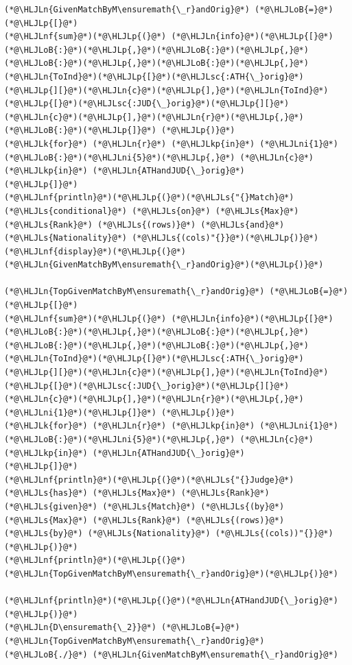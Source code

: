 \documentclass[12pt,a4paper]{article}
\newcommand{\HLJLk}[1]{\textcolor[RGB]{148,91,176}{\textbf{#1}}}
\newcommand{\HLJLkp}[1]{\textcolor[RGB]{148,91,176}{\textbf{#1}}}
\newcommand{\HLJLn}[1]{#1}
\newcommand{\HLJLnf}[1]{\textcolor[RGB]{66,102,213}{#1}}
\newcommand{\HLJLs}[1]{\textcolor[RGB]{201,61,57}{#1}}
\newcommand{\HLJLsc}[1]{\textcolor[RGB]{201,61,57}{#1}}
\newcommand{\HLJLni}[1]{\textcolor[RGB]{59,151,46}{#1}}
\newcommand{\HLJLoB}[1]{\textcolor[RGB]{102,102,102}{\textbf{#1}}}
\newcommand{\HLJLp}[1]{#1}
\begin{document}
\begin{lstlisting}
(*@\HLJLn{GivenMatchByM\ensuremath{\_r}andOrig}@*) (*@\HLJLoB{=}@*) (*@\HLJLp{[}@*)
(*@\HLJLnf{sum}@*)(*@\HLJLp{(}@*) (*@\HLJLn{info}@*)(*@\HLJLp{[}@*)(*@\HLJLoB{:}@*)(*@\HLJLp{,}@*)(*@\HLJLoB{:}@*)(*@\HLJLp{,}@*)(*@\HLJLoB{:}@*)(*@\HLJLp{,}@*)(*@\HLJLoB{:}@*)(*@\HLJLp{,}@*)(*@\HLJLn{ToInd}@*)(*@\HLJLp{[}@*)(*@\HLJLsc{:ATH{\_}orig}@*)(*@\HLJLp{][}@*)(*@\HLJLn{c}@*)(*@\HLJLp{],}@*)(*@\HLJLn{ToInd}@*)(*@\HLJLp{[}@*)(*@\HLJLsc{:JUD{\_}orig}@*)(*@\HLJLp{][}@*)(*@\HLJLn{c}@*)(*@\HLJLp{],}@*)(*@\HLJLn{r}@*)(*@\HLJLp{,}@*)(*@\HLJLoB{:}@*)(*@\HLJLp{]}@*) (*@\HLJLp{)}@*)
(*@\HLJLk{for}@*) (*@\HLJLn{r}@*) (*@\HLJLkp{in}@*) (*@\HLJLni{1}@*)(*@\HLJLoB{:}@*)(*@\HLJLni{5}@*)(*@\HLJLp{,}@*) (*@\HLJLn{c}@*) (*@\HLJLkp{in}@*) (*@\HLJLn{ATHandJUD{\_}orig}@*)
(*@\HLJLp{]}@*)
(*@\HLJLnf{println}@*)(*@\HLJLp{(}@*)(*@\HLJLs{"{}Match}@*) (*@\HLJLs{conditional}@*) (*@\HLJLs{on}@*) (*@\HLJLs{Max}@*) (*@\HLJLs{Rank}@*) (*@\HLJLs{(rows)}@*) (*@\HLJLs{and}@*) (*@\HLJLs{Nationality}@*) (*@\HLJLs{(cols)"{}}@*)(*@\HLJLp{)}@*)
(*@\HLJLnf{display}@*)(*@\HLJLp{(}@*)(*@\HLJLn{GivenMatchByM\ensuremath{\_r}andOrig}@*)(*@\HLJLp{)}@*)

(*@\HLJLn{TopGivenMatchByM\ensuremath{\_r}andOrig}@*) (*@\HLJLoB{=}@*) (*@\HLJLp{[}@*)
(*@\HLJLnf{sum}@*)(*@\HLJLp{(}@*) (*@\HLJLn{info}@*)(*@\HLJLp{[}@*)(*@\HLJLoB{:}@*)(*@\HLJLp{,}@*)(*@\HLJLoB{:}@*)(*@\HLJLp{,}@*)(*@\HLJLoB{:}@*)(*@\HLJLp{,}@*)(*@\HLJLoB{:}@*)(*@\HLJLp{,}@*)(*@\HLJLn{ToInd}@*)(*@\HLJLp{[}@*)(*@\HLJLsc{:ATH{\_}orig}@*)(*@\HLJLp{][}@*)(*@\HLJLn{c}@*)(*@\HLJLp{],}@*)(*@\HLJLn{ToInd}@*)(*@\HLJLp{[}@*)(*@\HLJLsc{:JUD{\_}orig}@*)(*@\HLJLp{][}@*)(*@\HLJLn{c}@*)(*@\HLJLp{],}@*)(*@\HLJLn{r}@*)(*@\HLJLp{,}@*)(*@\HLJLni{1}@*)(*@\HLJLp{]}@*) (*@\HLJLp{)}@*)
(*@\HLJLk{for}@*) (*@\HLJLn{r}@*) (*@\HLJLkp{in}@*) (*@\HLJLni{1}@*)(*@\HLJLoB{:}@*)(*@\HLJLni{5}@*)(*@\HLJLp{,}@*) (*@\HLJLn{c}@*) (*@\HLJLkp{in}@*) (*@\HLJLn{ATHandJUD{\_}orig}@*)
(*@\HLJLp{]}@*)
(*@\HLJLnf{println}@*)(*@\HLJLp{(}@*)(*@\HLJLs{"{}Judge}@*) (*@\HLJLs{has}@*) (*@\HLJLs{Max}@*) (*@\HLJLs{Rank}@*) (*@\HLJLs{given}@*) (*@\HLJLs{Match}@*) (*@\HLJLs{(by}@*) (*@\HLJLs{Max}@*) (*@\HLJLs{Rank}@*) (*@\HLJLs{(rows)}@*) (*@\HLJLs{by}@*) (*@\HLJLs{Nationality}@*) (*@\HLJLs{(cols))"{}}@*)(*@\HLJLp{)}@*)
(*@\HLJLnf{println}@*)(*@\HLJLp{(}@*)(*@\HLJLn{TopGivenMatchByM\ensuremath{\_r}andOrig}@*)(*@\HLJLp{)}@*)

(*@\HLJLnf{println}@*)(*@\HLJLp{(}@*)(*@\HLJLn{ATHandJUD{\_}orig}@*)(*@\HLJLp{)}@*)
(*@\HLJLn{D\ensuremath{\_2}}@*) (*@\HLJLoB{=}@*) (*@\HLJLn{TopGivenMatchByM\ensuremath{\_r}andOrig}@*) (*@\HLJLoB{./}@*) (*@\HLJLn{GivenMatchByM\ensuremath{\_r}andOrig}@*)
\end{lstlisting}
\end{document}
